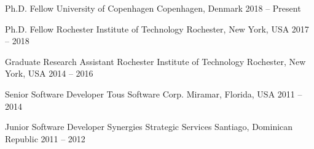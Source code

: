 

\begin{cventries}
  \cventry
    {Ph.D. Fellow}
    {University of Copenhagen}
    {Copenhagen, Denmark}
    {2018 -- Present}
    {}

  \cventry
    {Ph.D. Fellow}
    {Rochester Institute of Technology}
    {Rochester, New York, USA}
    {2017 -- 2018}
    {}

  \cventry
    {Graduate Research Assistant}
    {Rochester Institute of Technology}
    {Rochester, New York, USA}
    {2014 -- 2016}
    {}

  \cventry
    {Senior Software Developer}
    {Tous Software Corp.}
    {Miramar, Florida, USA}
    {2011 -- 2014}
    {}

  \cventry
    {Junior Software Developer}
    {Synergies Strategic Services}
    {Santiago, Dominican Republic}
    {2011 -- 2012}
    {}
	
\end{cventries}
